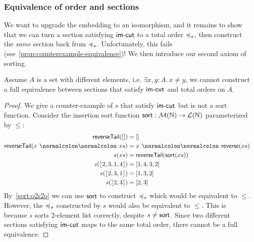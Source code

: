 \subsubsection{Equivalence of order and sections}

We want to upgrade the embedding to an isomorphism, and it
remains to show that we can turn a section satisfying $\operatorname{\mathsf{im-cut}}$ to a total order $\preccurlyeq_{s}$,
then construct the \emph{same} section back from $\preccurlyeq_{s}$.
%
Unfortunately, this fails (see~\cref{prop:counterexample-equivalence})!
%
We then introduce our second axiom of sorting.

\begin{toappendix}
    \begin{proposition}
        \label{prop:counterexample-equivalence}
        Assume $A$ is a set with different elements, i.e. $\exists x, y: A.\,x \neq y$,
        we cannot construct a full equivalence between sections that satisfy $\operatorname{\mathsf{im-cut}}$
        and total orders on $A$.
    \end{proposition}
    \begin{proof}
        We give a counter-example of $s$ that satisfy $\operatorname{\mathsf{im-cut}}$ but is not a sort function.
        Consider the insertion sort function $\operatorname{\mathsf{sort}} : \mathcal{M}(\mathbb{N}) \to \mathcal{L}(\mathbb{N})$
        parameterized by $\leq$:
        \begin{align*}
            \term{reverseTail}([])         & = []                                  \\
            \term{reverseTail}(x \cons xs) & = x \cons \term{reverse}(xs)          \\
            s(xs)                          & = \term{reverseTail}(\term{sort}(xs)) \\
            s(\bag{2,3,1,4})               & = [1,4,3,2]                           \\
            s(\bag{2,3,1})                 & = [1, 3, 2]                           \\
            s(\bag{2,3})                   & = [2, 3]                              \\
        \end{align*}
        By~\cref{sort:o2s2o} we can use $\operatorname{\mathsf{sort}}$ to construct $\preccurlyeq_{s}$ which would be
        equivalent to $\leq$. However, the $\preccurlyeq_{s}$ constructed by $s$ would also be equivalent
        to $\leq$. This is because $s$ sorts 2-element list correctly, despite $s \neq \operatorname{\mathsf{sort}}$.
        Since two different sections satisfying $\operatorname{\mathsf{im-cut}}$ maps to the same total order,
        there cannot be a full equivalence.
    \end{proof}
\end{toappendix}


